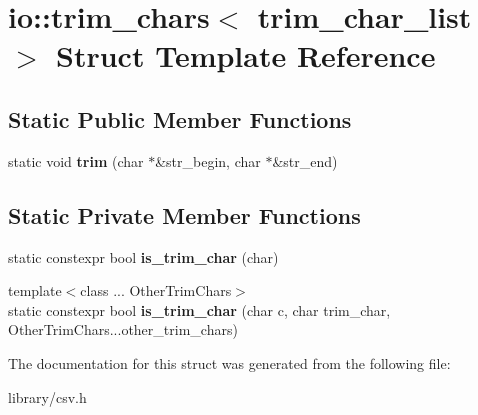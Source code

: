 \hypertarget{structio_1_1trim__chars}{}\section{io\+:\+:trim\+\_\+chars$<$ trim\+\_\+char\+\_\+list $>$ Struct Template Reference}
\label{structio_1_1trim__chars}
\subsection*{Static Public Member Functions}
\begin{DoxyCompactItemize}
\item 
\mbox{\label{structio_1_1trim__chars_a4cffc5e839ab4024ca8c8330e26e338c}} 
static void {\bfseries trim} (char $\ast$\&str\+\_\+begin, char $\ast$\&str\+\_\+end)
\end{DoxyCompactItemize}
\subsection*{Static Private Member Functions}
\begin{DoxyCompactItemize}
\item 
\mbox{\label{structio_1_1trim__chars_a8868df0aa3887f5968cab2fac9c746fb}} 
static constexpr bool {\bfseries is\+\_\+trim\+\_\+char} (char)
\item 
\mbox{\label{structio_1_1trim__chars_a4c365acae57f96990d08e9b4c6a89e48}} 
{\footnotesize template$<$class ... Other\+Trim\+Chars$>$ }\\static constexpr bool {\bfseries is\+\_\+trim\+\_\+char} (char c, char trim\+\_\+char, Other\+Trim\+Chars...\+other\+\_\+trim\+\_\+chars)
\end{DoxyCompactItemize}


The documentation for this struct was generated from the following file\+:\begin{DoxyCompactItemize}
\item 
library/csv.\+h\end{DoxyCompactItemize}
